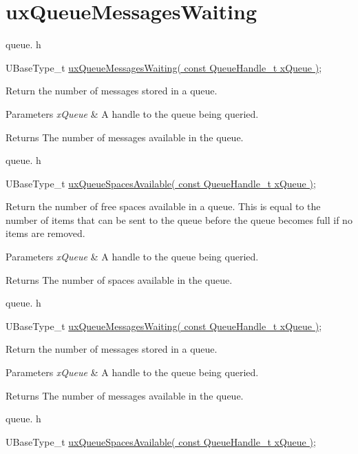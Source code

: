 \hypertarget{group__ux_queue_messages_waiting}{}\section{ux\+Queue\+Messages\+Waiting}
\label{group__ux_queue_messages_waiting}
queue. h 
\begin{DoxyPre}
UBaseType\_t \hyperlink{externals_2freertos_2include_2queue_8h_add7ee0701ba35904d190811b9e5a4eda}{uxQueueMessagesWaiting( const QueueHandle\_t xQueue )};
\end{DoxyPre}


Return the number of messages stored in a queue.


\begin{DoxyParams}{Parameters}
{\em x\+Queue} & A handle to the queue being queried.\\
\hline
\end{DoxyParams}
\begin{DoxyReturn}{Returns}
The number of messages available in the queue.
\end{DoxyReturn}
queue. h 
\begin{DoxyPre}
UBaseType\_t \hyperlink{externals_2freertos_2include_2queue_8h_aae75791e91707c1e0bb31d761921531c}{uxQueueSpacesAvailable( const QueueHandle\_t xQueue )};
\end{DoxyPre}


Return the number of free spaces available in a queue. This is equal to the number of items that can be sent to the queue before the queue becomes full if no items are removed.


\begin{DoxyParams}{Parameters}
{\em x\+Queue} & A handle to the queue being queried.\\
\hline
\end{DoxyParams}
\begin{DoxyReturn}{Returns}
The number of spaces available in the queue.
\end{DoxyReturn}
queue. h 
\begin{DoxyPre}UBaseType\_t \hyperlink{externals_2freertos_2include_2queue_8h_add7ee0701ba35904d190811b9e5a4eda}{uxQueueMessagesWaiting( const QueueHandle\_t xQueue )};\end{DoxyPre}


Return the number of messages stored in a queue.


\begin{DoxyParams}{Parameters}
{\em x\+Queue} & A handle to the queue being queried.\\
\hline
\end{DoxyParams}
\begin{DoxyReturn}{Returns}
The number of messages available in the queue.
\end{DoxyReturn}
queue. h 
\begin{DoxyPre}UBaseType\_t \hyperlink{externals_2freertos_2include_2queue_8h_aae75791e91707c1e0bb31d761921531c}{uxQueueSpacesAvailable( const QueueHandle\_t xQueue )};\end{DoxyPre}



